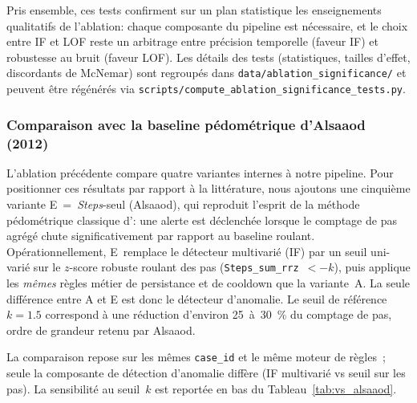 Pris ensemble, ces tests confirment sur un plan statistique les enseignements qualitatifs de
l'ablation: chaque composante du pipeline est nécessaire, et le choix entre
IF et LOF reste un arbitrage entre précision temporelle (faveur IF) et
robustesse au bruit (faveur LOF). Les détails des tests (statistiques,
tailles d'effet, discordants de McNemar) sont regroupés dans
\texttt{data/ablation\_significance/} et peuvent être régénérés via
\texttt{scripts/compute\_ablation\_significance\_tests.py}.

\FloatBarrier
\subsubsection{Comparaison avec la baseline pédométrique d'Alsaaod (2012)}
\label{subsubsec:alsaaod_baseline}

L'ablation précédente compare quatre variantes internes à notre pipeline.
Pour positionner ces résultats par rapport à la littérature, nous ajoutons
une cinquième variante E~=~\textit{Steps}-seul (Alsaaod), qui reproduit
l'esprit de la méthode pédométrique classique
d'\citet{alsaaod2012electronic}: une alerte est déclenchée lorsque le
comptage de pas agrégé chute significativement par rapport au baseline
roulant. Opérationnellement, E~remplace le détecteur multivarié (IF) par
un seuil uni-varié sur le $z$-score robuste roulant des pas
(\texttt{Steps\_sum\_rrz}~$< -k$), puis applique les \emph{mêmes} règles
métier de persistance et de cooldown que la variante~A. La seule
différence entre A et E est donc le détecteur d'anomalie. Le seuil de
référence $k = 1.5$ correspond à une réduction d'environ 25~à~30~\% du
comptage de pas, ordre de grandeur retenu par Alsaaod.

La comparaison repose sur les mêmes \texttt{case\_id} et le même moteur de règles~;
seule la composante de détection d'anomalie diffère (IF multivarié vs seuil sur les
pas). La sensibilité au seuil~$k$ est reportée en bas du Tableau~\ref{tab:vs_alsaaod}.


